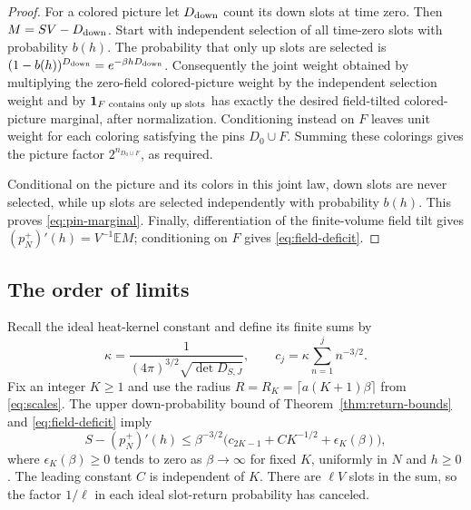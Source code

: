 \begin{proof}
For a colored picture let $D_{\rm down}$ count its down slots at time
zero. Then $M=SV-D_{\rm down}$. Start with independent selection of
all time-zero slots with probability $b(h)$. The probability that
only up slots are selected is
$(1-b(h))^{D_{\rm down}}=e^{-\beta hD_{\rm down}}$.
Consequently the joint weight obtained by multiplying the zero-field
colored-picture weight by the independent selection weight and by
$\mathbf1_{F\text{ contains only up slots}}$ has exactly the desired
field-tilted colored-picture marginal, after normalization.
Conditioning instead on $F$ leaves unit weight for each coloring
satisfying the pins $D_0\cup F$. Summing these colorings gives the
picture factor $2^{n_{D_0\cup F}}$, as required.

Conditional on the picture and its colors in this joint law, down
slots are never selected, while up slots are selected independently
with probability $b(h)$. This proves \eqref{eq:pin-marginal}.
Finally, differentiation of the finite-volume field tilt gives
$(p_N^+)'(h)=V^{-1}\mathbb E M$; conditioning on $F$ gives
\eqref{eq:field-deficit}.
\end{proof}

\subsection{The order of limits}

Recall the ideal heat-kernel constant and define its finite sums by
\begin{equation}
 \kappa=\frac1{(4\pi)^{3/2}\sqrt{\det D_{S,J}}},
 \qquad c_j=\kappa\sum_{n=1}^j n^{-3/2}.
 \label{eq:partial-bloch}
\end{equation}
Fix an integer $K\ge1$ and use the radius
$R=R_K=\lceil a(K+1)\beta\rceil$ from \eqref{eq:scales}.
The upper down-probability bound of Theorem~\ref{thm:return-bounds}
and \eqref{eq:field-deficit} imply
\begin{equation}
 S-(p_N^+)'(h)
 \le\beta^{-3/2}
       \bigl(c_{2K-1}+CK^{-1/2}+\epsilon_K(\beta)\bigr),
 \label{eq:pressure-upper}
\end{equation}
where $\epsilon_K(\beta)\ge0$ tends to zero as $\beta\to\infty$ for
fixed $K$, uniformly in $N$ and $h\ge0$. The leading constant $C$
is independent of $K$. There are $\ell V$ slots in the sum, so the
factor $1/\ell$ in each ideal slot-return probability has canceled.

